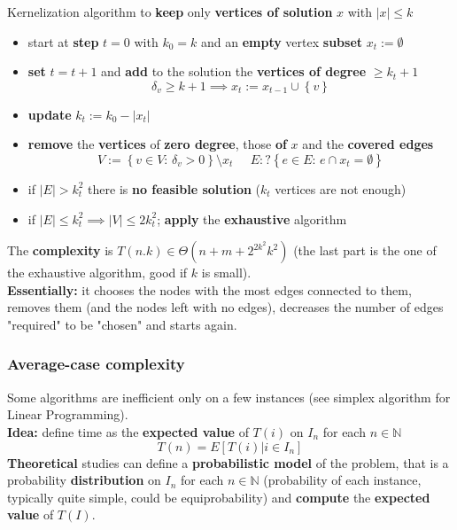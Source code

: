 \documentclass[11pt]{article}
\begin{document}
	Kernelization algorithm to \textbf{keep} only \textbf{vertices of solution} $x$ with $|x| \leq k$
	\begin{itemize}
		\item start at \textbf{step} $t = 0$ with $k_0 = k$ and an \textbf{empty} vertex \textbf{subset} $x_t := \emptyset$
		\item \textbf{set} $t = t + 1$ and \textbf{add} to the solution the \textbf{vertices of degree} $\geq k_t + 1$
		$$ \delta_v \geq k+1 \implies x_t := x_{t-1} \cup \left\{v\right\} $$
		\item \textbf{update} $k_t := k_0 − |x_t|$
		\item \textbf{remove} the \textbf{vertices} of \textbf{zero degree}, those \textbf{of} $x$ and the \textbf{covered edges}
		$$ V := \left\{v \in V : \, \delta_v > 0\right\} \setminus x_t \;\;\;\;\; E :? \left\{e \in E : \, e \cap x_t = \emptyset \right\} $$
		\item if $|E| > k_t^2$ there is \textbf{no feasible solution} ($k_t$ vertices are not enough)
		\item if $|E| \leq k_t^2 \implies |V| \leq 2k_t^2$; \textbf{apply} the \textbf{exhaustive} algorithm
	\end{itemize}
	The \textbf{complexity} is $T(n.k) \in \Theta \left(n + m + 2^{2k^2}k^2 \right)$ (the last part is the one of the exhaustive algorithm, good if $k$ is small).\\
	
	\textbf{Essentially:} it chooses the nodes with the most edges connected to them, removes them (and the nodes left with no edges), decreases the number of edges "required" to be "chosen" and starts again.\\
	
	\newpage
	
	\subsubsection{Average-case complexity}
	Some algorithms are inefficient only on a few instances (see simplex algorithm for Linear Programming).\\
	
	\textbf{Idea:} define time as the \textbf{expected value} of $T(i)$ on $I_n$ for each $n \in \mathbb{N}$
	$$ T(n) = E \left[T(i) | i \in I_n \right]$$
	\textbf{Theoretical} studies can define a \textbf{probabilistic model} of the problem, that is a probability \textbf{distribution} on $I_n$ for each $n \in \mathbb{N}$ (probability of each instance, typically quite simple, could be equiprobability) and \textbf{compute} the \textbf{expected value} of $T(I)$.\\
	
\end{document}
